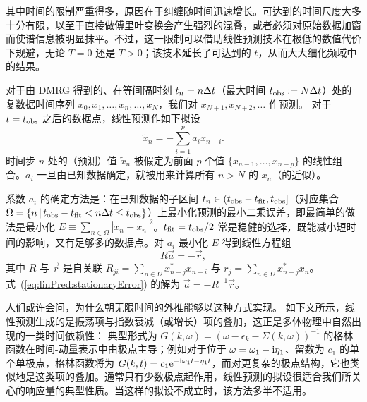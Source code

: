 \documentclass[a4paper,10pt,oneside,onecolumn,1p,times]{elsarticle}
\newcommand{\eul}{{\rm e }}
\newcommand{\imag}{{\rm i }}
\newcommand{\obs}{{\rm obs}}
\newcommand{\fit}{{\rm fit}}
\begin{document}
其中时间的限制严重得多，原因在于纠缠随时间迅速增长。可达到的时间尺度大多十分有限，以至于直接做傅里叶变换会产生强烈的混叠，或者必须对原始数据加窗而使谱信息被明显抹平。不过，这一限制可以借助线性预测技术在极低的数值代价下规避，无论 $T=0$\cite{Pereira08,White08} 还是 $T>0$\cite{Barthel09b}；该技术延长了可达到的 $t$，从而大大细化频域中的结果。

对于由 DMRG 得到的、在等间隔时刻 $t_n=n\*\Delta t$（最大时间 $t_\obs:= N \Delta t$）处的复数据时间序列 $x_0, x_1, \ldots, x_n, \ldots, x_N$，我们对 $x_{N+1}, x_{N+2}, \ldots$ 作预测。
对于 $t=t_\obs$ 之后的数据点，线性预测作如下拟设
\begin{equation}\label{eq:predictionAnsatz}
\tilde{x}_n = - \sum_{i=1}^p a_i x_{n-i} .
\end{equation}
时间步 $n$ 处的（预测）值 $\tilde{x}_n$ 被假定为前面 $p$ 个值 $\{x_{n-1},\dots,x_{n-p}\}$ 的线性组合。$a_i$ 一旦由已知数据确定，就被用来计算所有 $n>N$ 的 $x_n$（的近似）。

系数 $a_i$ 的确定方法是：在已知数据的子区间 $t_n \in (t_\obs-t_\fit,t_\obs]$（对应集合 $\Omega = \{ n\, |\, t_\obs - t_\fit < n\Delta t \leq t_\obs \}$）上最小化预测的最小二乘误差，即最简单的做法是最小化 $E\equiv\sum_{n\in\Omega} |\tilde x_n-x_n|^2$。$t_\fit=t_\obs/2$ 常是稳健的选择，既能减小短时间的影响，又有足够多的数据点。对 $a_i$ 最小化 $E$ 得到线性方程组
\begin{equation}
\label{eq:linPred:stationaryError}
R \vec{a} = -\vec{r},
\end{equation}
其中 $R$ 与 $\vec{r}$ 是自关联
$R_{ji} = \sum_{n\in\Omega} x^*_{n-j} x_{n-i}$ 与 $r_{j} = \sum_{n\in\Omega} x^*_{n-j} x_n$。
式~(\ref{eq:linPred:stationaryError}) 的解为 $\vec{a}=-R^{-1}\vec{r}$。

人们或许会问，为什么朝无限时间的外推能够以这种方式实现。
如下文所示，线性预测生成的是振荡项与指数衰减（或增长）项的叠加，这正是多体物理中自然出现的一类时间依赖性：
典型形式为 $G(k,\omega) = (\omega - \epsilon_k - \Sigma(k,\omega))^{-1}$ 的格林函数在时间-动量表示中由极点主导；例如对于位于 $\omega=\omega_1 -\imag \eta_1$、留数为 $c_1$ 的单个单极点，格林函数将为
$G(k,t) = c_1 \eul^{-\imag \omega_1 t - \eta_1 t}$，而对更复杂的极点结构，它也类似地是这类项的叠加。通常只有少数极点起作用，线性预测的拟设很适合我们所关心的响应量的典型性质。当这样的拟设不成立时，该方法多半不适用。
\end{document}
